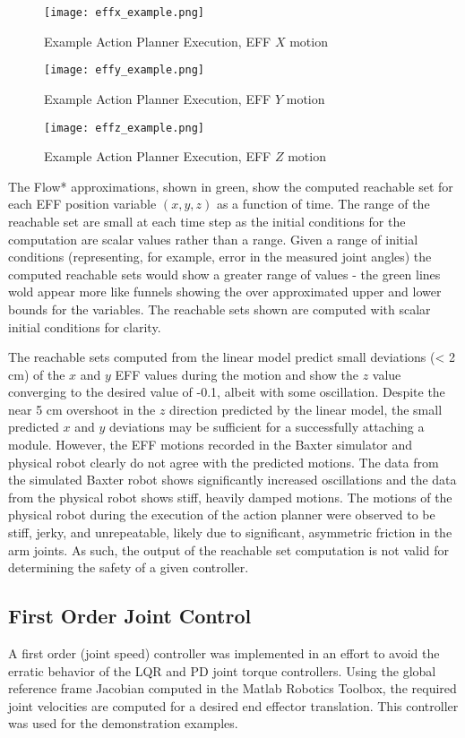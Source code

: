 \begin{figure}[h]
	\texttt{[image: effx\_example.png]}
	\caption{Example Action Planner Execution, EFF $X$ motion}
	\label{fig:effX}
\end{figure}

\begin{figure}[h]
	\texttt{[image: effy\_example.png]}
	\caption{Example Action Planner Execution, EFF $Y$ motion}
	\label{fig:effY}
\end{figure}

\begin{figure}[h]
	\texttt{[image: effz\_example.png]}
	\caption{Example Action Planner Execution, EFF $Z$ motion}
	\label{fig:effZ}
\end{figure}

The Flow* approximations, shown in green, show the computed reachable set for each EFF position variable $(x,y,z)$ as a function of time.
The range of the reachable set are small at each time step as the initial conditions for the computation are scalar values rather than a range.
Given a range of initial conditions (representing, for example, error in the measured joint angles) the computed reachable sets would show a greater range of values - the green lines wold appear more like funnels showing the over approximated upper and lower bounds for the variables.
The reachable sets shown are computed with scalar initial conditions for clarity.

The reachable sets computed from the linear model predict small deviations (< 2 cm) of the $x$ and $y$ EFF values during the motion and show the $z$ value converging to the desired value of -0.1, albeit with some oscillation.
Despite the near 5 cm overshoot in the $z$ direction predicted by the linear model, the small predicted $x$ and $y$ deviations may be sufficient for a successfully attaching a module.
However, the EFF motions recorded in the Baxter simulator and physical robot clearly do not agree with the predicted motions.
The data from the simulated Baxter robot shows significantly increased oscillations and the data from the physical robot shows stiff, heavily damped motions.
The motions of the physical robot during the execution of the action planner were observed to be stiff, jerky, and unrepeatable, likely due to significant, asymmetric friction in the arm joints.
As such, the output of the reachable set computation is not valid for determining the safety of a given controller.

\subsection{First Order Joint Control}
A first order (joint speed) controller was implemented in an effort to avoid the erratic behavior of the LQR and PD joint torque controllers.
Using the global reference frame Jacobian computed in the Matlab Robotics Toolbox, the required joint velocities are computed for a desired end effector translation.
This controller was used for the demonstration examples.









